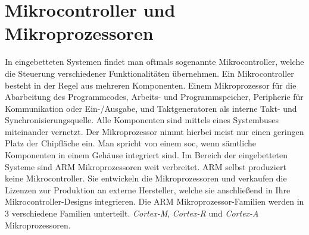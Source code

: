 \section{Mikrocontroller und Mikroprozessoren}

In eingebetteten Systemen findet man oftmals sogenannte Mikrocontroller, welche
die Steuerung verschiedener Funktionalitäten übernehmen.
Ein Mikrocontroller besteht in der Regel aus mehreren Komponenten.
Einem Mikroprozessor für die Abarbeitung des Programmcodes, Arbeits- und
Programmspeicher, Peripherie für Kommunikation oder Ein-/Ausgabe, und
Taktgeneratoren als interne Takt- und Synchronisierungsquelle.
Alle Komponenten sind mittels eines Systembuses miteinander
vernetzt\cite{DefGuideCM34_JYiu}.
Der Mikroprozessor nimmt hierbei meist nur einen geringen Platz der Chipfläche
ein.
Man spricht von einem \ac{soc}, wenn sämtliche Komponenten in einem Gehäuse
integriert sind.
\newline
Im Bereich der eingebetteten Systeme sind ARM Mikroprozessoren weit verbreitet.
ARM selbst produziert keine Mikrocontroller.
Sie entwickeln die Mikroprozessoren und verkaufen die Lizenzen zur Produktion
an externe Hersteller, welche sie anschließend in Ihre Mikrocontroller-Designs
integrieren.
\newline
Die ARM Mikroprozessor-Familien werden in 3 verschiedene Familien unterteilt.
\textit{Cortex-M}, \textit{Cortex-R} und \textit{Cortex-A} Mikroprozessoren.

